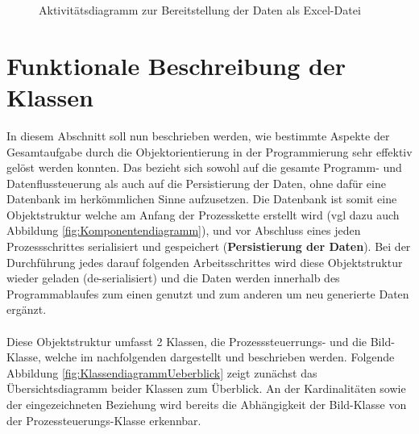 \documentclass[
fontsize=10pt, 
listof = totoc,
parskip = half	
]{report}
\begin{document}
\begin{figure}[H]
	\centering
	\caption{Aktivitätsdiagramm zur Bereitstellung der Daten als Excel-Datei}
	\label{fig:FlowDatenbereitstellung}
\end{figure}

\section{Funktionale Beschreibung der Klassen}
\label{sec:Klassendiagramme}

In diesem Abschnitt soll nun beschrieben werden, wie bestimmte Aspekte der Gesamtaufgabe durch die Objektorientierung in der Programmierung sehr effektiv gelöst werden konnten. Das bezieht sich sowohl auf die gesamte Programm- und Datenflussteuerung als auch auf die Persistierung der Daten, ohne dafür eine Datenbank im herkömmlichen Sinne aufzusetzen. Die Datenbank ist somit eine Objektstruktur welche am Anfang der Prozesskette erstellt  wird (vgl dazu auch Abbildung \ref{fig:Komponentendiagramm}), und vor Abschluss eines jeden Prozessschrittes serialisiert und gespeichert (\textbf{Persistierung der Daten}). Bei der Durchführung jedes darauf folgenden Arbeitsschrittes  wird diese Objektstruktur wieder geladen (de-serialisiert) und die Daten werden innerhalb des Programmablaufes zum einen genutzt und zum anderen um neu generierte Daten ergänzt.
\\\\
\noindent Diese Objektstruktur umfasst 2 Klassen, die Prozesssteuerrungs- und die Bild-Klasse, welche im nachfolgenden dargestellt und beschrieben werden. Folgende Abbildung \ref{fig:KlassendiagrammUeberblick}  zeigt zunächst das Übersichtsdiagramm beider Klassen zum Überblick. An der Kardinalitäten sowie der eingezeichneten Beziehung wird bereits die Abhängigkeit der Bild-Klasse von der Prozessteuerungs-Klasse erkennbar.
\end{document}
